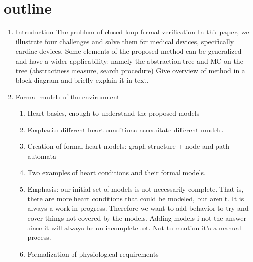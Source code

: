 \section{outline}

\begin{enumerate}
	\item Introduction
	\subitem The problem of closed-loop formal verification
	\subitem In this paper, we illustrate four challenges and solve them for medical devices, specifically cardiac devices. 
	\subitem Some elements of the proposed method can be generalized and have a wider applicability: namely the abstraction tree and MC on the tree (abstractness measure, search procedure)
	\subitem Give overview of method in a block diagram and briefly explain it in text.
	
	\item Formal models of the environment
	\begin{enumerate}
		\item Heart basics, enough to understand the proposed models
		\item Emphasis: different heart conditions necessitate different models.
		\item Creation of formal heart models: graph structure + node and path automata
		\item Two examples of heart conditions and their formal models.
		\item Emphasis: our initial set of models is not necessarily complete. That is, there are more heart conditions that could be modeled, but aren't. It is always a work in progress.	
		\subitem Therefore we want to add behavior to try and cover things not covered by the models. Adding models i not the answer since it will always be an incomplete set. Not to mention it's a manual process.
		\item Formalization of physiological requirements
	\end{enumerate}
	

\end{enumerate}
